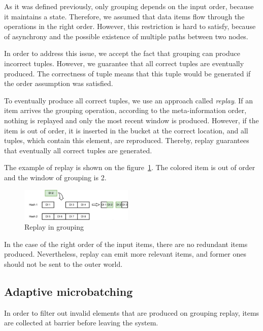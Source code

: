 \label {fs-collision}

As it was defined previously, only grouping depends on the input order, because it maintains a state. Therefore, we assumed that data items flow through the operations in the right order. However, this restriction is hard to satisfy, because of asynchrony and the possible existence of multiple paths between two nodes.

In order to address this issue, we accept the fact that grouping can produce incorrect tuples. However, we guarantee that all correct tuples are eventually produced. The correctness of tuple means that this tuple would be generated if the order assumption was satisfied. 

To eventually produce all correct tuples, we use an approach called {\it replay}. If an item arrives the grouping operation, according to the meta-information order, nothing is replayed and only the most recent window is produced. However, if the item is out of order, it is inserted in the bucket at the correct location, and all tuples, which contain this element, are reproduced. Thereby, replay guarantees that eventually all correct tuples are generated.

The example of replay is shown on the figure~\ref{grouping-replaying-figure}. The colored item is out of order and the window of grouping is 2.

\begin{figure}[htbp]
  \centering
  \includegraphics[width=0.48\textwidth]{pics/grouping-replaying}
  \caption{Replay in grouping}
  \label {grouping-replaying-figure}
\end{figure}

In the case of the right order of the input items, there are no redundant items produced. Nevertheless, replay can emit more relevant items, and former ones should not be sent to the outer world.

\subsection{Adaptive microbatching}
In order to filter out invalid elements that are produced on grouping replay, items are collected at barrier before leaving the system.

